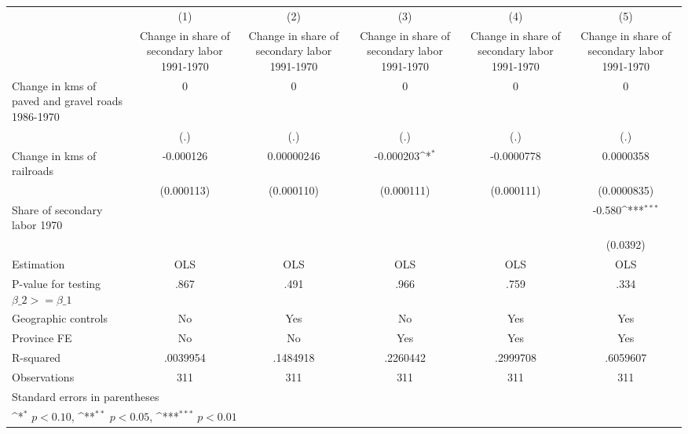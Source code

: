 {
\def\sym#1{\ifmmode^{#1}\else\(^{#1}\)\fi}
\begin{tabular}{l*{5}{c}}
\hline\hline
                    &\multicolumn{1}{c}{(1)}&\multicolumn{1}{c}{(2)}&\multicolumn{1}{c}{(3)}&\multicolumn{1}{c}{(4)}&\multicolumn{1}{c}{(5)}\\
                    &\multicolumn{1}{c}{Change in share of secondary labor 1991-1970}&\multicolumn{1}{c}{Change in share of secondary labor 1991-1970}&\multicolumn{1}{c}{Change in share of secondary labor 1991-1970}&\multicolumn{1}{c}{Change in share of secondary labor 1991-1970}&\multicolumn{1}{c}{Change in share of secondary labor 1991-1970}\\
\hline
Change in kms of paved and gravel roads 1986-1970&           0         &           0         &           0         &           0         &           0         \\
                    &         (.)         &         (.)         &         (.)         &         (.)         &         (.)         \\
[1em]
Change in kms of railroads&   -0.000126         &  0.00000246         &   -0.000203\sym{*}  &  -0.0000778         &   0.0000358         \\
                    &  (0.000113)         &  (0.000110)         &  (0.000111)         &  (0.000111)         & (0.0000835)         \\
[1em]
Share of secondary labor 1970&                     &                     &                     &                     &      -0.580\sym{***}\\
                    &                     &                     &                     &                     &    (0.0392)         \\
\hline
Estimation          &         OLS         &         OLS         &         OLS         &         OLS         &         OLS         \\
P-value for testing $\beta\_2 >= \beta\_1$&        .867         &        .491         &        .966         &        .759         &        .334         \\
Geographic controls &          No         &         Yes         &          No         &         Yes         &         Yes         \\
Province FE         &          No         &          No         &         Yes         &         Yes         &         Yes         \\
R-squared           &    .0039954         &    .1484918         &    .2260442         &    .2999708         &    .6059607         \\
Observations        &         311         &         311         &         311         &         311         &         311         \\
\hline\hline
\multicolumn{6}{l}{\footnotesize Standard errors in parentheses}\\
\multicolumn{6}{l}{\footnotesize \sym{*} \(p<0.10\), \sym{**} \(p<0.05\), \sym{***} \(p<0.01\)}\\
\end{tabular}
}
